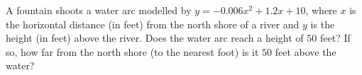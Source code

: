 A fountain shoots a water arc modelled by $y=-0.006x^2+1.2x+10$, where $x$ is the horizontal distance (in feet) from the north shore of a river and $y$ is the height (in feet) above the river. Does the water arc reach a height of $50$ feet? If so, how far from the north shore (to the nearest foot) is it $50$ feet above the water?

